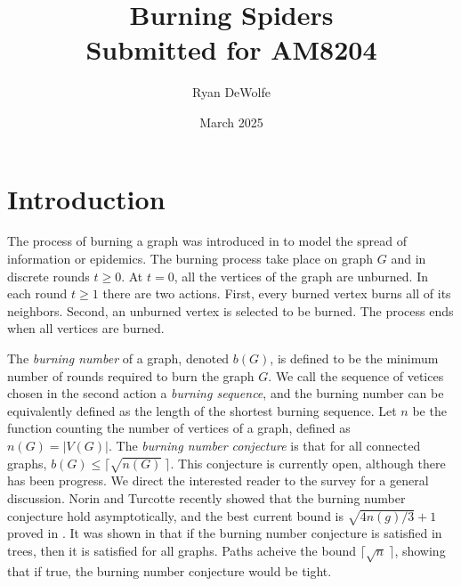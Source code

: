 \documentclass[12pt]{article}
\begin{document}
\title{
    Burning Spiders\\
    \large{Submitted for AM8204}
}
\author{Ryan DeWolfe}
\date{March 2025}
\maketitle


\section{Introduction}
The process of burning a graph was introduced in \cite{burning_intro} to model the spread of information or epidemics.
The burning process take place on graph $G$ and in discrete rounds $t \geq 0$. 
At $t=0$, all the vertices of the graph are unburned.
In each round $t \geq 1$ there are two actions.
First, every burned vertex burns all of its neighbors.
Second, an unburned vertex is selected to be burned.
The process ends when all vertices are burned.

The \textit{burning number} of a graph, denoted $b(G)$, is defined to be the minimum number of rounds required to burn the graph $G$.
We call the sequence of vetices chosen in the second action a \textit{burning sequence}, and the burning number can be equivalently defined as the length of the shortest burning sequence.
Let $n$ be the function counting the number of vertices of a graph, defined as $n(G) = |V(G)|$.
The \textit{burning number conjecture} \cite{burning_intro} is that for all connected graphs, $b(G) \leq \lceil \sqrt{n(G)}\ \rceil$.
This conjecture is currently open, although there has been progress.
We direct the interested reader to the survey \cite{burning_survey} for a general discussion.
Norin and Turcotte \cite{asymptotic_bnc} recently showed that the burning number conjecture hold asymptotically, and the best current bound is $\sqrt{4n(g) \slash 3} + 1$ proved in \cite{best_bnc}. 
It was shown in \cite{burning_intro} that if the burning number conjecture is satisfied in trees, then it is satisfied for all graphs.
Paths acheive the bound $\lceil \sqrt{n}\ \rceil$, showing that if true, the burning number conjecture would be tight.
\end{document}
